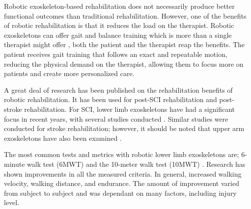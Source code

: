 Robotic exoskeleton-based rehabilitation does not necessarily produce better functional outcomes than traditional rehabilitation. However, one of the benefits of robotic rehabilitation is that it reduces the load on the therapist. Robotic exoskeletons can offer gait and balance training which is more than a single therapist might offer \cite{guidingLeg}, both the patient and the therapist reap the benefits. The patient receives gait training that follows an exact and repeatable motion, reducing the physical demand on the therapist, allowing them to focus more on patients and create more personalized care.  


A great deal of research has been published on the rehabilitation benefits of robotic rehabilitation. It has been used for post-SCI rehabilitation and post-stroke rehabilitation. For SCI, lower limb exoskeletons have had a significant focus in recent years, with several studies conducted \cite{esquenazi2012rewalk} \cite{zeilig2012safety} \cite{6876184}. Similar studies were conducted for stroke rehabilitation; however, it should be noted that upper arm exoskeletons have also been examined \cite{chang2013robot} \cite{ho2011emg}. 

The most common tests and metrics with robotic lower limb exoskeletons are; 6-minute walk test (6MWT) and the 10-meter walk test (10MWT) \cite{amatachaya2014concurrent}. Research has shown improvements in all the measured criteria. In general, increased walking velocity, walking distance, and endurance. The amount of improvement varied from subject to subject and was dependant on many factors, including injury level.   